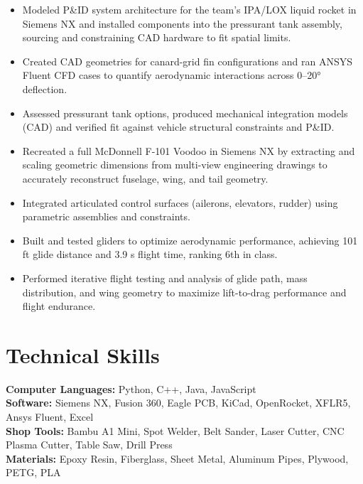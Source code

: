 \begin{itemize}
  \item Modeled P\&ID system architecture for the team's IPA/LOX liquid rocket in Siemens NX and installed components into the pressurant tank assembly, sourcing and constraining CAD hardware to fit spatial limits.
  \item Created CAD geometries for canard-grid fin configurations and ran ANSYS Fluent CFD cases to quantify aerodynamic interactions across 0--20° deflection.
  \item Assessed pressurant tank options, produced mechanical integration models (CAD) and verified fit against vehicle structural constraints and P\&ID.
\end{itemize}
\entrygap

\begin{itemize}
  \item Recreated a full McDonnell F-101 Voodoo in Siemens NX by extracting and scaling geometric dimensions from multi-view engineering drawings to accurately reconstruct fuselage, wing, and tail geometry.
  \item Integrated articulated control surfaces (ailerons, elevators, rudder) using parametric assemblies and constraints.
\end{itemize}
\entrygap

\begin{itemize}
  \item Built and tested gliders to optimize aerodynamic performance, achieving 101 ft glide distance and 3.9 s flight time, ranking 6th in class.
  \item Performed iterative flight testing and analysis of glide path, mass distribution, and wing geometry to maximize lift-to-drag performance and flight endurance.
\end{itemize}

\section{Technical Skills}
\textbf{Computer Languages:} Python, C++, Java, JavaScript\\
\textbf{Software:} Siemens NX, Fusion 360, Eagle PCB, KiCad, OpenRocket, XFLR5, Ansys Fluent, Excel\\
\textbf{Shop Tools:} Bambu A1 Mini, Spot Welder, Belt Sander, Laser Cutter, CNC Plasma Cutter, Table Saw, Drill Press\\
\textbf{Materials:} Epoxy Resin, Fiberglass, Sheet Metal, Aluminum Pipes, Plywood, PETG, PLA

